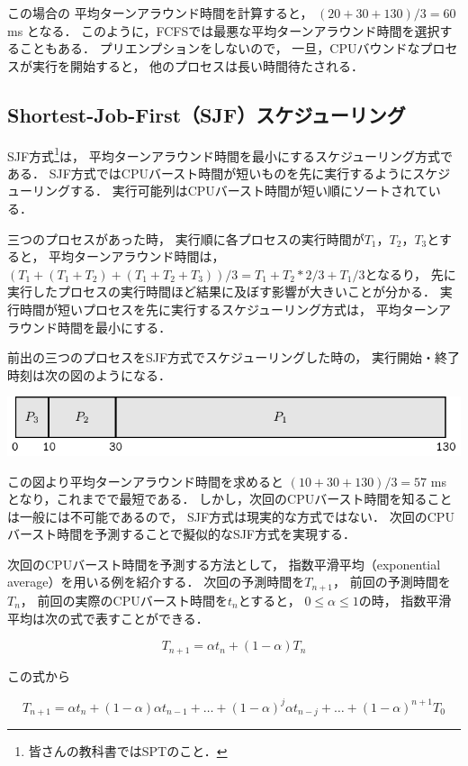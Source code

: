 この場合の
平均ターンアラウンド時間を計算すると，
$(20+30+130) / 3 = 60$ ms となる．
このように，FCFSでは最悪な平均ターンアラウンド時間を選択することもある．
プリエンプションをしないので，
一旦，CPUバウンドなプロセスが実行を開始すると，
他のプロセスは長い時間待たされる．

\subsection{Shortest-Job-First（SJF）スケジューリング}
SJF方式\footnote{皆さんの教科書ではSPTのこと．}は，
平均ターンアラウンド時間を最小にするスケジューリング方式である．
SJF方式ではCPUバースト時間が短いものを先に実行するようにスケジューリングする．
実行可能列はCPUバースト時間が短い順にソートされている．

三つのプロセスがあった時，
実行順に各プロセスの実行時間が$T_1$，$T_2$，$T_3$とすると，
平均ターンアラウンド時間は，
$(T_1+(T_1+T_2)+(T_1+T_2+T_3))/3=T_1+T_2*2/3+T_1/3$となるり，
先に実行したプロセスの実行時間ほど結果に及ぼす影響が大きいことが分かる．
実行時間が短いプロセスを先に実行するスケジューリング方式は，
平均ターンアラウンド時間を最小にする．

前出の三つのプロセスをSJF方式でスケジューリングした時の，
実行開始・終了時刻は次の図のようになる．

\begin{center}
\includegraphics[scale=1.0]{Tbl/sjf1.pdf}
\end{center}

この図より平均ターンアラウンド時間を求めると
$(10+30+130)/3 = 57$ ms となり，これまでで最短である．
しかし，次回のCPUバースト時間を知ることは一般には不可能であるので，
SJF方式は現実的な方式ではない．
次回のCPUバースト時間を予測することで擬似的なSJF方式を実現する．

次回のCPUバースト時間を予測する方法として，
指数平滑平均（exponential average）を用いる例を紹介する．
次回の予測時間を$T_{n+1}$，
前回の予測時間を$T_{n}$，
前回の実際のCPUバースト時間を$t_{n}$とすると，
$0 \le \alpha \le 1$の時，
指数平滑平均は次の式で表すことができる．

\[T_{n+1} = \alpha t_n + ( 1 - \alpha ) T_n\]

この式から

\[T_{n+1} = \alpha t_n + ( 1 - \alpha ) \alpha t_{n-1} + \dots +
 ( 1 - \alpha )^j \alpha t_{n-j} + \dots + (1 - \alpha )^{n+1} T_0 \]

